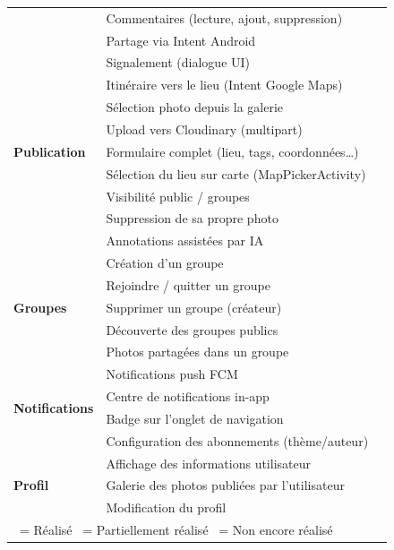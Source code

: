 \documentclass[12pt, a4paper]{report}
\newcommand{\cmark}{\textcolor{success}{\ding{51}}}
\newcommand{\xmark}{\textcolor{danger}{\ding{55}}}
\newcommand{\pmark}{\textcolor{warning}{\ding{119}}}
\begin{document}
\begin{table}[H]
\begin{tabularx}{\textwidth}{lXc}
  & Commentaires (lecture, ajout, suppression)       & \cmark \\
  & Partage via Intent Android                       & \cmark \\
  & Signalement (dialogue UI)                        & \pmark \\
  & Itinéraire vers le lieu (Intent Google Maps)     & \cmark \\
\midrule
\multirow{5}{*}{\textbf{Publication}}
  & Sélection photo depuis la galerie                & \cmark \\
  & Upload vers Cloudinary (multipart)               & \cmark \\
  & Formulaire complet (lieu, tags, coordonnées…)    & \cmark \\
  & Sélection du lieu sur carte (MapPickerActivity)  & \cmark \\
  & Visibilité public / groupes                      & \cmark \\
  & Suppression de sa propre photo                   & \cmark \\
  & Annotations assistées par IA                     & \xmark \\
\midrule
\multirow{5}{*}{\textbf{Groupes}}
  & Création d'un groupe                             & \cmark \\
  & Rejoindre / quitter un groupe                    & \cmark \\
  & Supprimer un groupe (créateur)                   & \cmark \\
  & Découverte des groupes publics                   & \cmark \\
  & Photos partagées dans un groupe                  & \cmark \\
\midrule
\multirow{4}{*}{\textbf{Notifications}}
  & Notifications push FCM                           & \cmark \\
  & Centre de notifications in-app                   & \cmark \\
  & Badge sur l'onglet de navigation                 & \cmark \\
  & Configuration des abonnements (thème/auteur)     & \xmark \\
\midrule
\multirow{3}{*}{\textbf{Profil}}
  & Affichage des informations utilisateur           & \cmark \\
  & Galerie des photos publiées par l'utilisateur    & \xmark \\
  & Modification du profil                           & \xmark \\
\bottomrule
\multicolumn{3}{l}{\footnotesize \cmark~= Réalisé \quad \pmark~= Partiellement réalisé \quad \xmark~= Non encore réalisé}
\end{tabularx}
\end{table}
\end{document}

